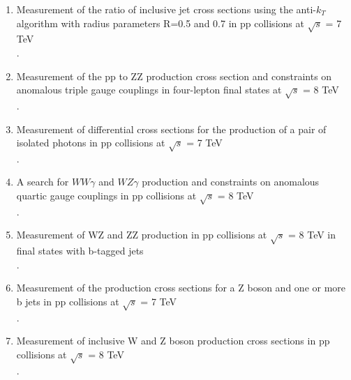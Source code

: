 \documentclass [12pt]{report}
\begin{document}
\begin{enumerate}

\item Measurement of the ratio of inclusive jet cross sections using the anti-$k_T$ algorithm with radius parameters R=0.5 and 0.7 in pp collisions at $\sqrt{s}$ = 7 TeV \\
.

\item Measurement of the pp to ZZ production cross section and constraints on anomalous triple gauge couplings in four-lepton final states at $\sqrt{s}$ = 8 TeV
\\
.

\item Measurement of differential cross sections for the production of a pair of isolated photons in pp collisions at $\sqrt{s}$ = 7 TeV \\
.

\item A search for $WW\gamma$ and $WZ\gamma$ production and constraints on anomalous quartic gauge couplings in pp collisions at $\sqrt{s}$ = 8 TeV \\
.

\item Measurement of WZ and ZZ production in pp collisions at $\sqrt{s}$ = 8 TeV in final states with b-tagged jets \\
.

\item Measurement of the production cross sections for a Z boson and one or more b jets in pp collisions at $\sqrt{s}$ = 7 TeV\\
.

\item Measurement of inclusive W and Z boson production cross sections in pp collisions at $\sqrt{s}$ = 8 TeV \\
.


\end{enumerate}
\end{document}

